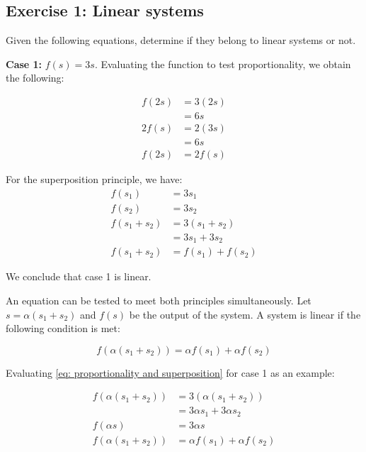\subsection{Exercise 1: Linear systems}
Given the following equations, determine if they belong to 
linear systems or not.

\textbf{Case 1:} $f(s) = 3s$. Evaluating the function to 
test proportionality, we obtain the following:

\begin{equation*}
 \begin{split}
  f(2s) & =3(2s)\\
  & = 6 s\\
  2 f(s) &= 2 (3s)\\
  &= 6s\\
  f(2s)&=2f(s)
 \end{split}
\end{equation*}

For the superposition principle, we have:
\begin{equation*}
 \begin{split}
  f(s_1) & =3s_1\\
  f(s_2) & =3s_2\\
  f(s_1+s_2) & =3(s_1+s_2)\\
   &= 3s_1 + 3s_2\\
  f(s_1 + s_2) & = f(s_1) + f(s_2)
 \end{split}
\end{equation*}

We conclude that case 1 is linear.

\vspace*{1cm}

An equation can be tested to meet both principles 
simultaneously. Let $s=\alpha(s_1+s_2)$ and $f(s)$ be the 
output of the system. A system is linear if the following 
condition is met:

\begin{equation}
  f(\alpha(s_1+s_2))  = \alpha f(s_1) + \alpha f(s_2)
  \label{eq: proportionality and superposition}
\end{equation}

Evaluating \ref{eq: proportionality and superposition} for 
case 1 as an example:

\begin{equation*}
\begin{split}
 f(\alpha (s_1 + s_2)) & = 3 (\alpha (s_1 + s_2))\\
 & = 3 \alpha s_1 + 3 \alpha s_2\\
 f(\alpha s) & = 3 \alpha s \\
 f(\alpha (s_1 + s_2)) & = \alpha f(s_1) + \alpha f(s_2)
\end{split}
\end{equation*}

